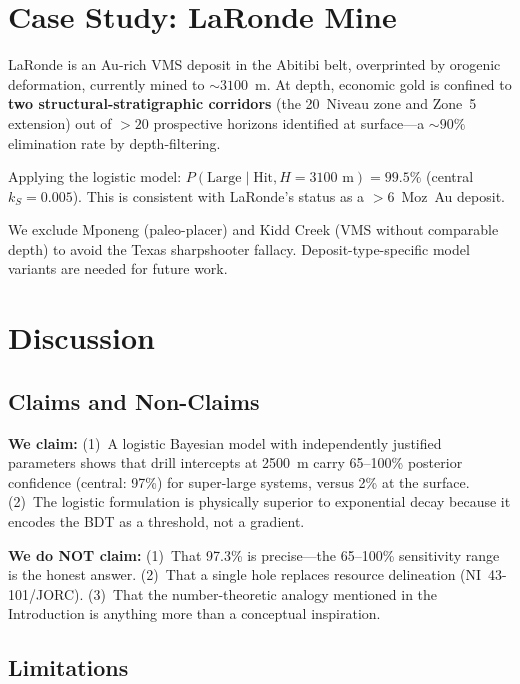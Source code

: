 \documentclass[11pt,a4paper]{article}
\begin{document}
\section{Case Study: LaRonde Mine}

LaRonde is an Au-rich VMS deposit in the Abitibi belt, overprinted by orogenic deformation, currently mined to ${\sim}3100$~m.
At depth, economic gold is confined to \textbf{two structural-stratigraphic corridors} (the 20~Niveau zone and Zone~5 extension) out of ${>}20$ prospective horizons identified at surface---a ${\sim}90\%$ elimination rate by depth-filtering.

Applying the logistic model: $P(\text{Large} \mid \text{Hit}, H = 3100\text{ m}) = 99.5\%$ (central $k_S = 0.005$).
This is consistent with LaRonde's status as a ${>}6$~Moz~Au deposit.

We exclude Mponeng (paleo-placer) and Kidd Creek (VMS without comparable depth) to avoid the Texas sharpshooter fallacy.
Deposit-type-specific model variants are needed for future work.

\section{Discussion}

\subsection{Claims and Non-Claims}

\textbf{We claim:}
(1)~A logistic Bayesian model with independently justified parameters shows that drill intercepts at 2500~m carry 65--100\% posterior confidence (central: 97\%) for super-large systems, versus 2\% at the surface.
(2)~The logistic formulation is physically superior to exponential decay because it encodes the BDT as a threshold, not a gradient.

\textbf{We do NOT claim:}
(1)~That 97.3\% is precise---the 65--100\% sensitivity range is the honest answer.
(2)~That a single hole replaces resource delineation (NI~43-101/JORC).
(3)~That the number-theoretic analogy mentioned in the Introduction is anything more than a conceptual inspiration.

\subsection{Limitations}
\end{document}
